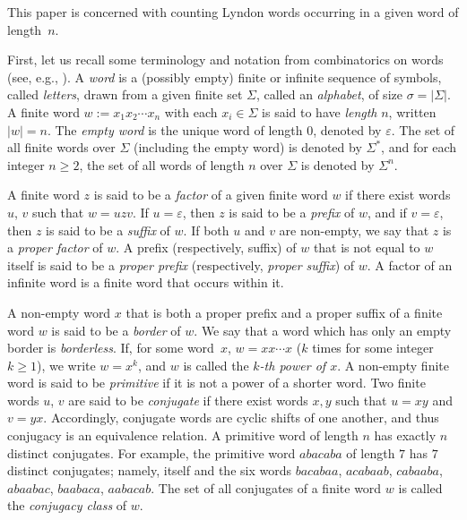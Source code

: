 \documentclass[11pt]{amsart}
\newcommand{\1}{\bar{1}}
\newcommand{\empt}{\varepsilon}
\theoremstyle{plain}
\theoremstyle{definition}
\theoremstyle{remark}
\begin{document}
This paper is concerned with counting Lyndon words occurring in a given word of length~$n$.

First, let us recall some terminology and notation from combinatorics on words (see, e.g., \cite{L1,mL02alge}).  A \textit{word} is a (possibly empty) finite or infinite sequence of symbols,
called \textit{letters}, drawn from a given finite set $\Sigma$, called an \textit{alphabet}, of size $\sigma = |\Sigma|$. A finite word $w:=x_1x_2\cdots x_n$ with each $x_i  \in \Sigma$ is said to have \textit{length} $n$, written $|w| = n$. The {\em empty word} is the unique word of length $0$, denoted by $\varepsilon$. The set of all finite words over $\Sigma$ (including the empty word) is denoted by $\Sigma^*$, and for each integer $n \geq 2$, the set of all words of length $n$ over $\Sigma$ is denoted by $\Sigma^n$. 

A finite word $z$ is said to be a \textit{factor} of a given finite word $w$ if there exist words $u$, $v$ such that $w = uzv$. If $u=\empt$, then $z$ is said to be a \textit{prefix} of $w$, and if $v=\empt$, then $z$ is said to be a \textit{suffix} of $w$. If both $u$ and $v$ are non-empty, we say that $z$ is a \textit{proper factor} of $w$. A prefix (respectively, suffix) of $w$ that is not equal to $w$ itself is said to be a \textit{proper prefix} (respectively, \textit{proper suffix}) of $w$. A factor of an infinite word is a finite word that occurs within it. 

A non-empty word $x$ that is both a proper prefix and a proper suffix of a finite word $w$ is said to be a \textit{border} of $w$. We say that a word which has only an empty border is \textit{borderless}. If, for some word~$x$, $w = xx\cdots x$ ($k$ times for some integer $k \ge 1$), we write $w = x^k$, and $w$ is called the \textit{$k$-th power of $x$}. A non-empty finite word is said to be \textit{primitive} if it is not a power of a shorter word. Two finite words $u$, $v$ are said to be \textit{conjugate} if there exist words $x, y$ such that $u=xy$ and $v=yx$. Accordingly, conjugate words are cyclic shifts of one another, and thus conjugacy is an equivalence relation. A primitive word of length $n$ has exactly $n$ distinct conjugates. For example, the primitive word $abacaba$ of length $7$ has $7$ distinct conjugates; namely, itself and the six words $bacabaa$, $acabaab$, $cabaaba$, $abaabac$, $baabaca$, $aabacab$. The set of all conjugates of a finite word $w$ is called the \textit{conjugacy class} of $w$.
\end{document}
